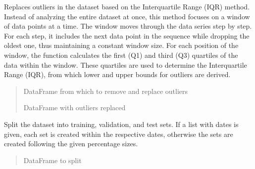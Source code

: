 \documentclass[letterpaper,10pt,english]{sphinxmanual}
\begin{document}
\begin{fulllineitems}
\begin{fulllineitems}
\label{\detokenize{docs/data_preprocessing:data_preprocessing.DataPreprocessor.replace_outliers}}
\pysigstartsignatures
{}
\pysigstopsignatures
\sphinxAtStartPar
Replaces outliers in the dataset based on the Interquartile Range (IQR)
method. Instead of analyzing the entire dataset at once, this method focuses on a window of data points at a time.
The window moves through the data series step by step. For each step, it includes the next data point
in the sequence while dropping the oldest one, thus maintaining a constant
window size. For each position of the window, the function calculates the
first (Q1) and third (Q3) quartiles of the data within the window. These
quartiles are used to determine the Interquartile Range (IQR), from which
lower and upper bounds for outliers are derived.
\begin{quote}\begin{description}
\sphinxAtStartPar
{} \textendash{} DataFrame from which to remove and replace outliers

\sphinxAtStartPar
DataFrame with outliers replaced

\end{description}\end{quote}

\end{fulllineitems}


\begin{fulllineitems}
\label{\detokenize{docs/data_preprocessing:data_preprocessing.DataPreprocessor.split_data}}
\pysigstartsignatures
{}
\pysigstopsignatures
\sphinxAtStartPar
Split the dataset into training, validation, and test sets.
If a list with dates is given, each set is created within the respective dates, otherwise the sets are created following
the given percentage sizes.
\begin{quote}\begin{description}
\sphinxAtStartPar
{} \textendash{} DataFrame to split


\end{description}
\end{quote}
\end{fulllineitems}
\end{fulllineitems}
\end{document}
